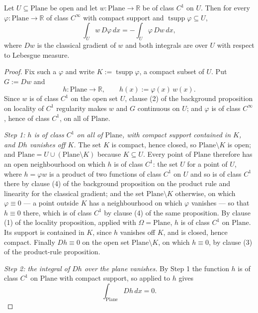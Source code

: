 \begin{lemma}
Let $U\subseteq\mathrm{Plane}$ be open and let $w\colon\mathrm{Plane}\to\mathbb{R}$ be of class
$C^{1}$ on $U$.  Then for every $\varphi\colon\mathrm{Plane}\to\mathbb{R}$ of class $C^{\infty}$
with compact support and $\operatorname{tsupp}\varphi\subseteq U$,
\[
  \int_U w\,D\varphi\,dx=-\int_U\varphi\,Dw\,dx ,
\]
where $Dw$ is the classical gradient of $w$ and both integrals are over $U$ with respect to
Lebesgue measure.
\end{lemma}
\begin{proof}
Fix such a $\varphi$ and write $K:=\operatorname{tsupp}\varphi$, a compact subset of $U$.  Put
$G:=Dw$ and
\[
  h\colon\mathrm{Plane}\to\mathbb{R},\qquad h(x):=\varphi(x)\,w(x).
\]
Since $w$ is of class $C^{1}$ on the open set $U$, clause (2) of the background proposition on
locality of $C^{1}$ regularity makes $w$ and $G$ continuous on $U$; and $\varphi$ is of class
$C^{\infty}$, hence of class $C^{1}$, on all of $\mathrm{Plane}$.

\medskip\noindent\emph{Step 1: $h$ is of class $C^{1}$ on all of $\mathrm{Plane}$, with compact
support contained in $K$, and $Dh$ vanishes off $K$.}
The set $K$ is compact, hence closed, so $\mathrm{Plane}\setminus K$ is open; and
$\mathrm{Plane}=U\cup(\mathrm{Plane}\setminus K)$ because $K\subseteq U$.  Every point of
$\mathrm{Plane}$ therefore has an open neighbourhood on which $h$ is of class $C^{1}$: the set
$U$ for a point of $U$, where $h=\varphi w$ is a product of two functions of class $C^{1}$ on
$U$ and so is of class $C^{1}$ there by clause (4) of the background proposition on the product
rule and linearity for the classical gradient; and the set $\mathrm{Plane}\setminus K$
otherwise, on which $\varphi\equiv0$ --- a point outside $K$ has a neighbourhood on which
$\varphi$ vanishes --- so that $h\equiv0$ there, which is of class $C^{1}$ by clause (4) of the
same proposition.  By clause (1) of the locality proposition, applied with
$\Omega=\mathrm{Plane}$, $h$ is of class $C^{1}$ on $\mathrm{Plane}$.  Its support is contained
in $K$, since $h$ vanishes off $K$, and is closed, hence compact.  Finally $Dh\equiv0$ on the
open set $\mathrm{Plane}\setminus K$, on which $h\equiv0$, by clause (3) of the product-rule
proposition.

\medskip\noindent\emph{Step 2: the integral of $Dh$ over the plane vanishes.}
By Step 1 the function $h$ is of class $C^{1}$ on $\mathrm{Plane}$ with compact support, so
 applied to $h$ gives
\begin{equation}\label{eq:cgwg-zero}
  \int_{\mathrm{Plane}}Dh\,dx=0 .
\end{equation}


\end{proof}
